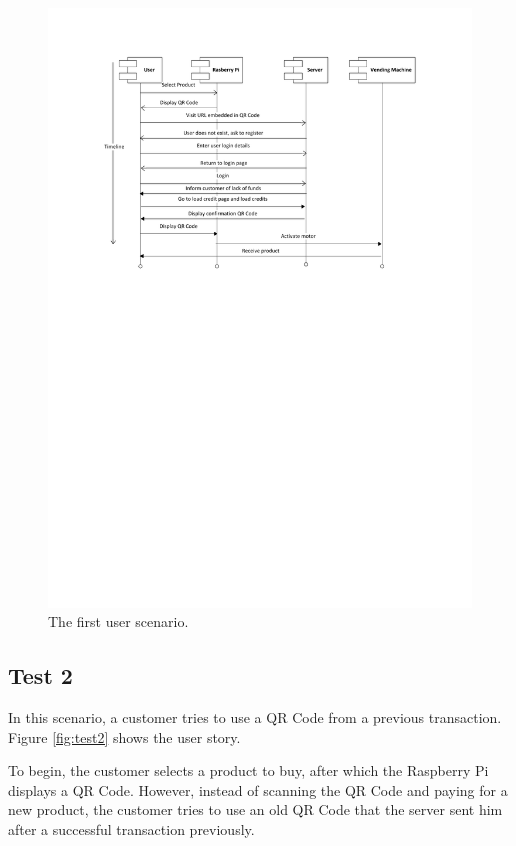 \begin{figure}
 \centering 
 \includegraphics[clip=true, trim = 0 470 0 50,
 scale=0.7]{user_story_1}
 \caption{The first user scenario.}
 \label{fig:test1}
\end{figure}

\subsection{Test 2}

In this scenario, a customer tries to use a QR Code from a previous transaction. Figure
\ref{fig:test2} shows the user story.

To begin, the customer selects a product to buy, after which the Raspberry Pi displays a
QR Code. However, instead of scanning the QR Code and paying for a new product, the
customer tries to use an old QR Code that the server sent him after a successful
transaction previously. 

